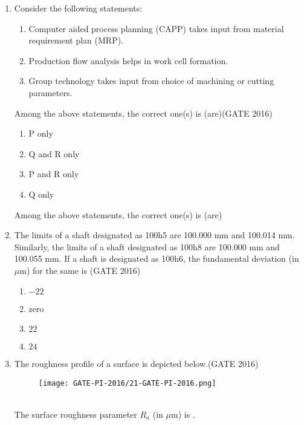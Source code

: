 \documentclass[journal,12pt,onecolumn]{IEEEtran}
\theoremstyle{remark}
\begin{document}
\begin{enumerate}
\item Consider the following statements:
\begin{enumerate}[label=(\Alph*)]
    \item Computer aided process planning (CAPP) takes input from material requirement plan (MRP).
    \item Production flow analysis helps in work cell formation.
    \item Group technology takes input from choice of machining or cutting parameters.
\end{enumerate}
Among the above statements, the correct one(s) is (are)\hfill{(GATE 2016)}
\begin{multicols}{2}
\begin{enumerate}
    \item P only
    \item Q and R only
    \item P and R only
    \item Q only
\end{enumerate}
\end{multicols}
\vspace{0.5cm}

Among the above statements, the correct one(s) is (are)
\item The limits of a shaft designated as 100h5 are 100.000 mm and 100.014 mm. Similarly, the limits of a shaft designated as 100h8 are 100.000 mm and 100.055 mm. If a shaft is designated as 100h6, the fundamental deviation (in $\mu$m) for the same is \hfill{(GATE 2016)}
\begin{multicols}{4}
\begin{enumerate}
    \item $-22$
    \item zero
    \item $22$
    \item $24$
\end{enumerate}
\end{multicols}
\vspace{0.5cm}

\item The roughness profile of a surface is depicted below.\hfill{(GATE 2016)}
\begin{figure}[h!]
    \centering
    
    \texttt{[image: GATE-PI-2016/21-GATE-PI-2016.png]}
    \caption{}
    \label{q21}
\end{figure}
\\The surface roughness parameter $R_{a}$ (in $\mu$m) is \underline{\hspace{1cm}}.
\vspace{0.5cm}







\end{enumerate}
\end{document}
